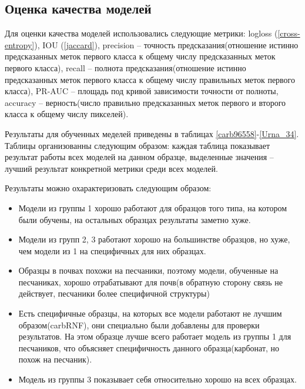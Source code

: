 \documentclass[12pt, a4paper]{extarticle}
\begin{document}
\subsection{Оценка качества моделей}

Для оценки качества моделей использовались следующие метрики:
logloss (\ref{cross-entropy}), IOU (\ref{jaccard}), precision -- точность предсказания(отношение истинно предсказанных меток первого класса к общему числу предсказанных меток первого класса), recall -- полнота предсказания(отношение истинно предсказанных меток первого класса к общему числу правильных меток первого класса), PR-AUC -- площадь под кривой зависимости точности от полноты, accuracy -- верность(число правильно предсказанных меток первого и второго класса к общему числу пикселей).

Результаты для обученных меделей приведены в таблицах \ref{carb96558}-\ref{Urna_34}. Таблицы организованны следующим образом: каждая таблица показывает результат работы всех моделей на данном образце, выделенные значения -- лучший результат конкретной метрики среди всех моделей. 

Результаты можно охарактеризовать следующим образом:
\begin{itemize}
	\item Модели из группы 1 хорошо работают для образцов того типа, на котором были обучены, на остальных образцах результаты заметно хуже.
	
	\item Модели из групп 2, 3 работают хорошо на большинстве образцов, но хуже, чем модели из 1 на специфичных для них образцах.
	
	\item Образцы в почвах похожи на песчаники, поэтому модели, обученные на песчаниках, хорошо отрабатывают для почв(в обратную сторону связь не действует, песчаники более специфичной структуры)
	
	\item Есть специфичные образцы, на которых все модели работают не лучшим образом(carbRNF), они специально были добавлены для проверки результатов. На этом образце лучше всего работает модель из группы 1 для песчаников, что объясняет специфичность данного образца(карбонат, но похож на песчаник).
	
	\item Модель из группы 3 показывает себя относительно хорошо на всех образцах.
	
\end{itemize}
\end{document}

